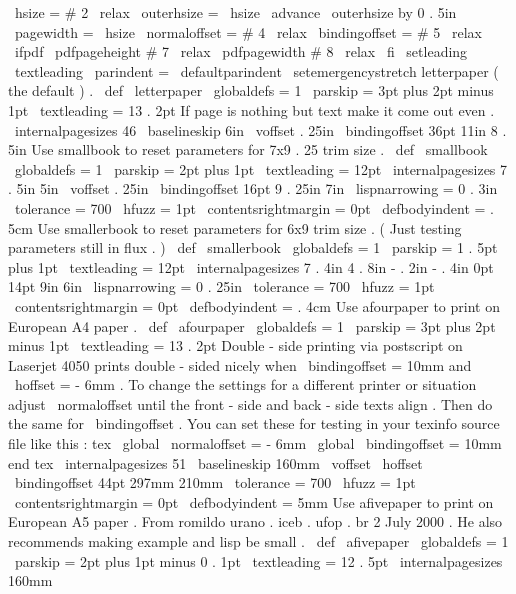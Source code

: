 {{{%
\
hsize
=
#
2
\
relax
\
outerhsize
=
\
hsize
\
advance
\
outerhsize
by
0
.
5in
\
pagewidth
=
\
hsize
%
\
normaloffset
=
#
4
\
relax
\
bindingoffset
=
#
5
\
relax
%
\
ifpdf
\
pdfpageheight
#
7
\
relax
\
pdfpagewidth
#
8
\
relax
\
fi
%
\
setleading
{
\
textleading
}
%
\
parindent
=
\
defaultparindent
\
setemergencystretch
}
%
letterpaper
(
the
default
)
.
\
def
\
letterpaper
{
{
\
globaldefs
=
1
\
parskip
=
3pt
plus
2pt
minus
1pt
\
textleading
=
13
.
2pt
%
%
If
page
is
nothing
but
text
make
it
come
out
even
.
\
internalpagesizes
{
46
\
baselineskip
}
{
6in
}
%
{
\
voffset
}
{
.
25in
}
%
{
\
bindingoffset
}
{
36pt
}
%
{
11in
}
{
8
.
5in
}
%
}
}
%
Use
smallbook
to
reset
parameters
for
7x9
.
25
trim
size
.
\
def
\
smallbook
{
{
\
globaldefs
=
1
\
parskip
=
2pt
plus
1pt
\
textleading
=
12pt
%
\
internalpagesizes
{
7
.
5in
}
{
5in
}
%
{
\
voffset
}
{
.
25in
}
%
{
\
bindingoffset
}
{
16pt
}
%
{
9
.
25in
}
{
7in
}
%
%
\
lispnarrowing
=
0
.
3in
\
tolerance
=
700
\
hfuzz
=
1pt
\
contentsrightmargin
=
0pt
\
defbodyindent
=
.
5cm
}
}
%
Use
smallerbook
to
reset
parameters
for
6x9
trim
size
.
%
(
Just
testing
parameters
still
in
flux
.
)
\
def
\
smallerbook
{
{
\
globaldefs
=
1
\
parskip
=
1
.
5pt
plus
1pt
\
textleading
=
12pt
%
\
internalpagesizes
{
7
.
4in
}
{
4
.
8in
}
%
{
-
.
2in
}
{
-
.
4in
}
%
{
0pt
}
{
14pt
}
%
{
9in
}
{
6in
}
%
%
\
lispnarrowing
=
0
.
25in
\
tolerance
=
700
\
hfuzz
=
1pt
\
contentsrightmargin
=
0pt
\
defbodyindent
=
.
4cm
}
}
%
Use
afourpaper
to
print
on
European
A4
paper
.
\
def
\
afourpaper
{
{
\
globaldefs
=
1
\
parskip
=
3pt
plus
2pt
minus
1pt
\
textleading
=
13
.
2pt
%
%
Double
-
side
printing
via
postscript
on
Laserjet
4050
%
prints
double
-
sided
nicely
when
\
bindingoffset
=
10mm
and
\
hoffset
=
-
6mm
.
%
To
change
the
settings
for
a
different
printer
or
situation
adjust
%
\
normaloffset
until
the
front
-
side
and
back
-
side
texts
align
.
Then
%
do
the
same
for
\
bindingoffset
.
You
can
set
these
for
testing
in
%
your
texinfo
source
file
like
this
:
%
tex
%
\
global
\
normaloffset
=
-
6mm
%
\
global
\
bindingoffset
=
10mm
%
end
tex
\
internalpagesizes
{
51
\
baselineskip
}
{
160mm
}
{
\
voffset
}
{
\
hoffset
}
%
{
\
bindingoffset
}
{
44pt
}
%
{
297mm
}
{
210mm
}
%
%
\
tolerance
=
700
\
hfuzz
=
1pt
\
contentsrightmargin
=
0pt
\
defbodyindent
=
5mm
}
}
%
Use
afivepaper
to
print
on
European
A5
paper
.
%
From
romildo
urano
.
iceb
.
ufop
.
br
2
July
2000
.
%
He
also
recommends
making
example
and
lisp
be
small
.
\
def
\
afivepaper
{
{
\
globaldefs
=
1
\
parskip
=
2pt
plus
1pt
minus
0
.
1pt
\
textleading
=
12
.
5pt
%
\
internalpagesizes
{
160mm
}}}}}
